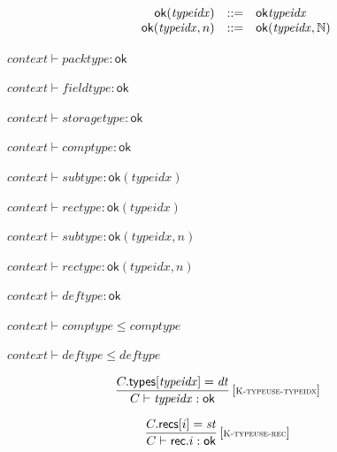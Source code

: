 \vspace{1ex}

$$
\begin{array}[t]{@{}lrrl@{}l@{}}
& {\mathsf{ok}}{({\mathit{typeidx}})} & ::= & {\mathsf{ok}}{{\mathit{typeidx}}} \\
& {\mathsf{ok}}{({\mathit{typeidx}}, n)} & ::= & {\mathsf{ok}}{({\mathit{typeidx}}, \mathbb{N})} \\
\end{array}
$$

$\boxed{{\mathit{context}} \vdash {\mathit{packtype}} : \mathsf{ok}}$

$\boxed{{\mathit{context}} \vdash {\mathit{fieldtype}} : \mathsf{ok}}$

$\boxed{{\mathit{context}} \vdash {\mathit{storagetype}} : \mathsf{ok}}$

$\boxed{{\mathit{context}} \vdash {\mathit{comptype}} : \mathsf{ok}}$

$\boxed{{\mathit{context}} \vdash {\mathit{subtype}} : {\mathsf{ok}}{({\mathit{typeidx}})}}$

$\boxed{{\mathit{context}} \vdash {\mathit{rectype}} : {\mathsf{ok}}{({\mathit{typeidx}})}}$

$\boxed{{\mathit{context}} \vdash {\mathit{subtype}} : {\mathsf{ok}}{({\mathit{typeidx}}, n)}}$

$\boxed{{\mathit{context}} \vdash {\mathit{rectype}} : {\mathsf{ok}}{({\mathit{typeidx}}, n)}}$

$\boxed{{\mathit{context}} \vdash {\mathit{deftype}} : \mathsf{ok}}$

$\boxed{{\mathit{context}} \vdash {\mathit{comptype}} \leq {\mathit{comptype}}}$

$\boxed{{\mathit{context}} \vdash {\mathit{deftype}} \leq {\mathit{deftype}}}$

\vspace{1ex}

$$
\begin{array}{@{}c@{}}\displaystyle
\frac{
C{.}\mathsf{types}{}[{\mathit{typeidx}}] = {\mathit{dt}}
}{
C \vdash {\mathit{typeidx}} : \mathsf{ok}
} \, {[\textsc{\scriptsize K{-}typeuse{-}typeidx}]}
\qquad
\end{array}
$$

$$
\begin{array}{@{}c@{}}\displaystyle
\frac{
C{.}\mathsf{recs}{}[i] = {\mathit{st}}
}{
C \vdash \mathsf{rec} {.} i : \mathsf{ok}
} \, {[\textsc{\scriptsize K{-}typeuse{-}rec}]}
\qquad
\end{array}
$$

